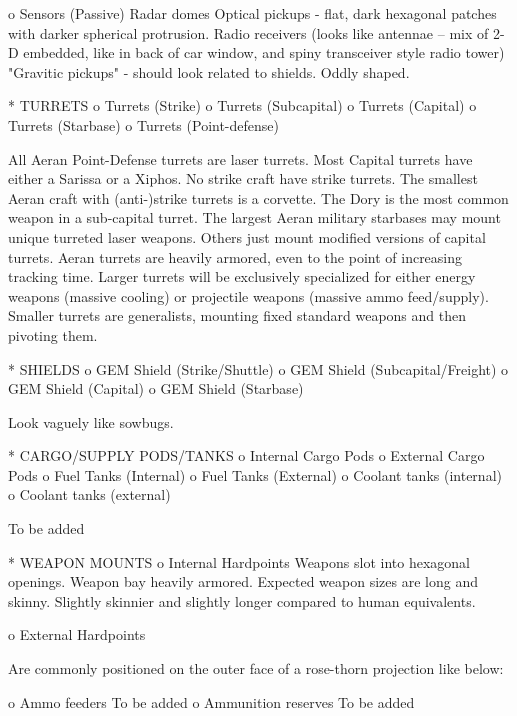           o Sensors (Passive)
            Radar domes
            Optical pickups - flat, dark hexagonal patches with darker spherical protrusion.
            Radio receivers (looks like antennae -- mix of 2-D embedded, like in back of car window, and spiny transceiver style radio tower)
            "Gravitic pickups" - should look related to shields. Oddly shaped.


    * TURRETS
          o Turrets (Strike)
          o Turrets (Subcapital)
          o Turrets (Capital)
          o Turrets (Starbase)
          o Turrets (Point-defense)

            All Aeran Point-Defense turrets are laser turrets.
            Most Capital turrets have either a Sarissa or a Xiphos.
            No strike craft have strike turrets. The smallest Aeran craft with (anti-)strike turrets is a corvette.
            The Dory is the most common weapon in a sub-capital turret.
            The largest Aeran military starbases may mount unique turreted laser weapons. Others just mount modified versions of capital turrets.
            Aeran turrets are heavily armored, even to the point of increasing tracking time.
            Larger turrets will be exclusively specialized for either energy weapons (massive cooling) or projectile weapons (massive ammo feed/supply). Smaller turrets are generalists, mounting fixed standard weapons and then pivoting them.


    * SHIELDS
          o GEM Shield (Strike/Shuttle)
          o GEM Shield (Subcapital/Freight)
          o GEM Shield (Capital)
          o GEM Shield (Starbase)


Look vaguely like sowbugs.

    * CARGO/SUPPLY PODS/TANKS
          o Internal Cargo Pods
          o External Cargo Pods
          o Fuel Tanks (Internal)
          o Fuel Tanks (External)
          o Coolant tanks (internal)
          o Coolant tanks (external)

To be added

    * WEAPON MOUNTS
          o Internal Hardpoints
            Weapons slot into hexagonal openings. Weapon bay heavily armored.
            Expected weapon sizes are long and skinny. Slightly skinnier and slightly longer compared to human equivalents.

          o External Hardpoints

Are commonly positioned on the outer face of a rose-thorn projection like below:

          o Ammo feeders
            To be added
          o Ammunition reserves
            To be added

